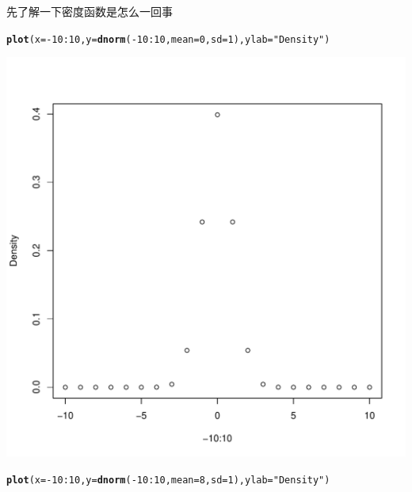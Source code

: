 \documentclass{article}\usepackage[]{graphicx}\usepackage[]{color}
\makeatletter
\def\maxwidth{ %
  \ifdim\Gin@nat@width>\linewidth
    \linewidth
  \else
    \Gin@nat@width
  \fi
}
\newcommand{\hlnum}[1]{\textcolor[rgb]{0.686,0.059,0.569}{#1}}%
\newcommand{\hlstr}[1]{\textcolor[rgb]{0.192,0.494,0.8}{#1}}%
\newcommand{\hlopt}[1]{\textcolor[rgb]{0,0,0}{#1}}%
\newcommand{\hlstd}[1]{\textcolor[rgb]{0.345,0.345,0.345}{#1}}%
\newcommand{\hlkwc}[1]{\textcolor[rgb]{0.333,0.667,0.333}{#1}}%
\newcommand{\hlkwd}[1]{\textcolor[rgb]{0.737,0.353,0.396}{\textbf{#1}}}%
\newenvironment{kframe}{%
 \def\at@end@of@kframe{}%
 \ifinner\ifhmode%
  \def\at@end@of@kframe{\end{minipage}}%
  \begin{minipage}{\columnwidth}%
 \fi\fi%
 \def\FrameCommand##1{\hskip\@totalleftmargin \hskip-\fboxsep
 \colorbox{shadecolor}{##1}\hskip-\fboxsep
     \hskip-\linewidth \hskip-\@totalleftmargin \hskip\columnwidth}%
 \MakeFramed {\advance\hsize-\width
   \@totalleftmargin\z@ \linewidth\hsize
   \@setminipage}}%
 {\par\unskip\endMakeFramed%
 \at@end@of@kframe}
\newenvironment{knitrout}{}{} %
\makeatother
\begin{document}
先了解一下密度函数是怎么一回事
\begin{knitrout}
\color{fgcolor}\begin{kframe}
\begin{alltt}
\hlkwd{plot}\hlstd{(}\hlkwc{x} \hlstd{=} \hlopt{-}\hlnum{10}\hlopt{:}\hlnum{10}\hlstd{,} \hlkwc{y} \hlstd{=} \hlkwd{dnorm}\hlstd{(}\hlopt{-}\hlnum{10}\hlopt{:}\hlnum{10}\hlstd{,} \hlkwc{mean} \hlstd{=} \hlnum{0}\hlstd{,} \hlkwc{sd} \hlstd{=} \hlnum{1}\hlstd{),} \hlkwc{ylab} \hlstd{=} \hlstr{"Density"}\hlstd{)}
\end{alltt}
\end{kframe}
\includegraphics[width=\maxwidth]{figure/unnamed-chunk-21} 
\begin{kframe}\begin{alltt}
\hlkwd{plot}\hlstd{(}\hlkwc{x} \hlstd{=} \hlopt{-}\hlnum{10}\hlopt{:}\hlnum{10}\hlstd{,} \hlkwc{y} \hlstd{=} \hlkwd{dnorm}\hlstd{(}\hlopt{-}\hlnum{10}\hlopt{:}\hlnum{10}\hlstd{,} \hlkwc{mean} \hlstd{=} \hlnum{8}\hlstd{,} \hlkwc{sd} \hlstd{=} \hlnum{1}\hlstd{),} \hlkwc{ylab} \hlstd{=} \hlstr{"Density"}\hlstd{)}
\end{alltt}
\end{kframe}

\end{knitrout}
\end{document}
